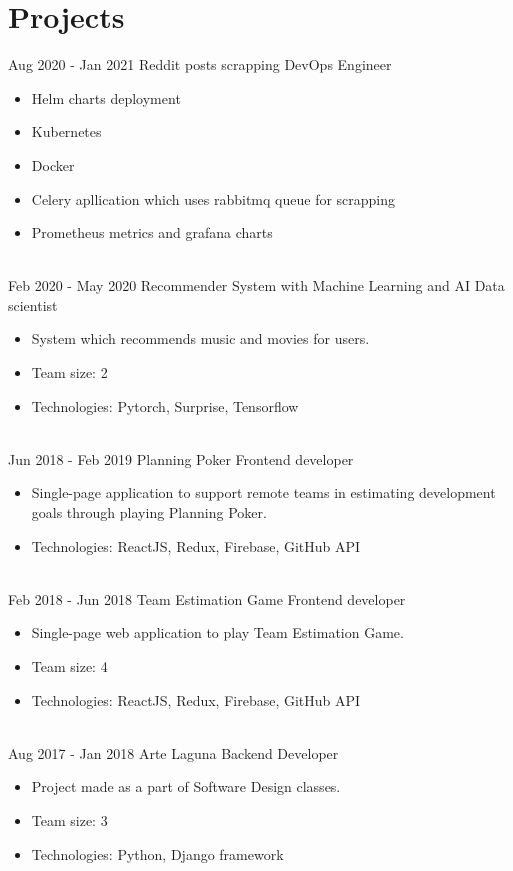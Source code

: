 \documentclass[letterpaper]{tenseconds} %
\begin{document}
\section{Projects}

\begin{twenty} %
	\twentyitem
	{Aug 2020 -}
	{Jan 2021}
	{Reddit posts scrapping \href{https://github.com/kk0walski/KubernetesScrapper}{\faGithub}}
	{DevOps Engineer}
	{}
	{\begin{itemize}
			\item Helm charts deployment
			\item Kubernetes
			\item Docker
			\item Celery apllication which uses rabbitmq queue for scrapping
			\item Prometheus metrics and grafana charts
		\end{itemize}}
	\\
	\twentyitem
	{Feb 2020 -}
	{May 2020}
	{Recommender System with Machine Learning and AI \href{https://sundog-education.com/recsys/}{\faExternalLink}}
	{Data scientist}
	{}
	{\begin{itemize}
			\item System which recommends music and movies for users.
			\item Team size: 2
			\item Technologies: Pytorch, Surprise, Tensorflow
		\end{itemize}}
	\\
	\twentyitem
	{Jun 2018 -}
	{Feb 2019}
	{Planning Poker \href{https://github.com/kk0walski/PlanningPoker}{\faGithub}}
	{Frontend developer}
	{}
	{\begin{itemize}
			\item Single-page application to support remote teams in estimating development goals through playing Planning Poker.
			\item Technologies: ReactJS, Redux, Firebase, GitHub API
		\end{itemize}}
	\\
	\twentyitem
	{Feb 2018 -}
	{Jun 2018}
	{Team Estimation Game  \href{https://www.github.com/kk0walski/reactiveTeamEstimationGame}{\faGithub}}
	{Frontend developer}
	{}
	{\begin{itemize}
			\item Single-page web application to play Team Estimation Game.
			\item Team size: 4
			\item Technologies: ReactJS, Redux, Firebase, GitHub API
		\end{itemize}}
	\\
	\twentyitem
	{Aug 2017 -}
	{Jan 2018}
	{Arte Laguna \href{https://github.com/kk0walski/konkurs}{\faGithub}}
	{Backend Developer}
	{}
	{\begin{itemize}
			\item Project made as a part of Software Design classes.
			\item Team size: 3
			\item Technologies: Python, Django framework
		\end{itemize}}
\end{twenty}
\end{document}
